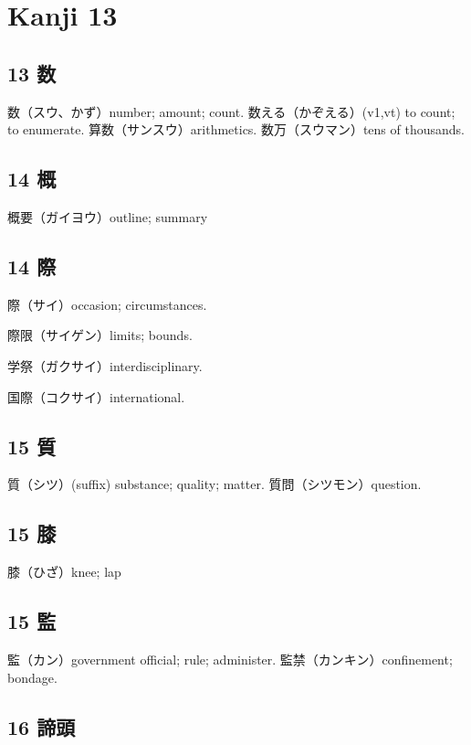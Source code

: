 \chapter{Kanji 13}

\section{13 数}

数（スウ、かず）number; amount; count.
数える（かぞえる）(v1,vt) to count; to enumerate.
算数（サンスウ）arithmetics.
数万（スウマン）tens of thousands.

\section{14 概}

概要（ガイヨウ）outline; summary

\section{14 際}

際（サイ）occasion; circumstances.

際限（サイゲン）limits; bounds.

学祭（ガクサイ）interdisciplinary.

国際（コクサイ）international.

\section{15 質}

質（シツ）(suffix) substance; quality; matter.
質問（シツモン）question.

\section{15 膝}

膝（ひざ）knee; lap

\section{15 監}

監（カン）government official; rule; administer.
監禁（カンキン）confinement; bondage.

\section{16 諦頭}

